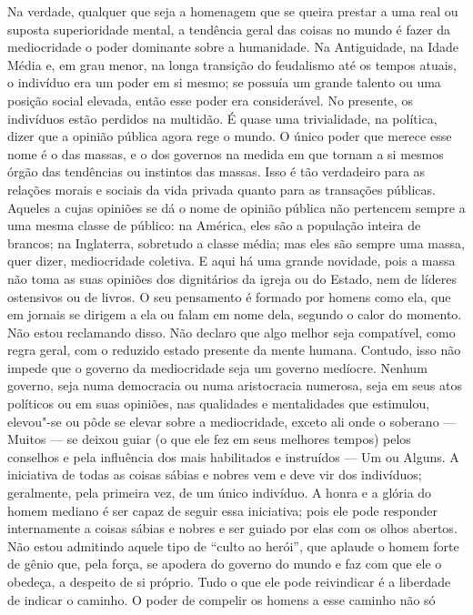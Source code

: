Na verdade, qualquer que seja a homenagem que se queira prestar a uma
real ou suposta superioridade mental, a tendência geral das coisas no
mundo é fazer da mediocridade o poder dominante sobre a humanidade. Na
Antiguidade, na Idade Média e, em grau menor, na longa transição do
feudalismo até os tempos atuais, o indivíduo era um poder em si mesmo;
se possuía um grande talento ou uma posição social elevada, então esse
poder era considerável. No presente, os indivíduos estão perdidos na
multidão. É quase uma trivialidade, na política, dizer que a opinião
pública agora rege o mundo. O único poder que merece esse nome é o das
massas, e o dos governos na medida em que tornam a si mesmos órgão das
tendências ou instintos das massas. Isso é tão verdadeiro para as
relações morais e sociais da vida privada quanto para as transações
públicas. Aqueles a cujas opiniões se dá o nome de opinião pública não
pertencem sempre a uma mesma classe de público: na América, eles
são a população inteira de brancos; na Inglaterra, sobretudo a classe
média; mas eles são sempre uma massa, quer dizer, mediocridade
coletiva. E aqui há uma grande novidade, pois a massa não toma as suas
opiniões dos dignitários da igreja ou do Estado, nem de líderes
ostensivos ou de livros. O seu pensamento é formado por homens como ela,
que em jornais se dirigem a ela ou falam em nome dela, segundo o calor
do momento. Não estou reclamando disso. Não declaro que algo melhor
seja compatível, como regra geral, com o reduzido estado presente da
mente humana. Contudo, isso não impede que o governo da mediocridade
seja um governo medíocre. Nenhum governo, seja numa democracia ou numa
aristocracia numerosa, seja em seus atos políticos ou em suas opiniões,
nas qualidades e mentalidades que estimulou, elevou"-se ou pôde se
elevar sobre a mediocridade, exceto ali onde o soberano --- Muitos --- se
deixou guiar (o que ele fez em seus melhores tempos) pelos conselhos e
pela influência dos mais habilitados e instruídos --- Um ou Alguns. 
A iniciativa de todas as coisas sábias e nobres vem e deve
vir dos indivíduos; geralmente, pela primeira vez, de um único indivíduo.
A honra e a glória do homem mediano é ser capaz de seguir essa
iniciativa; pois ele pode responder internamente a coisas sábias e
nobres e ser guiado por elas com os olhos abertos. Não estou admitindo
aquele tipo de “culto ao herói”, que aplaude o homem forte de gênio
que, pela força, se apodera do governo do mundo e faz com que ele o
obedeça, a despeito de si próprio. Tudo o que ele pode reivindicar é a liberdade de
indicar o caminho. O poder de compelir os homens a esse caminho não só
